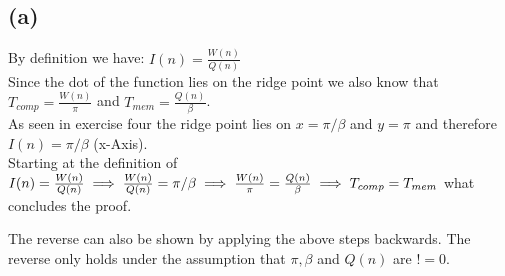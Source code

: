 \documentclass[10pt,a4paper,oneside,notitlepage]{report}
\begin{document}
\subsection*{(a)}
By definition we have: 
$I(n)=\frac{W(n)}{Q(n)}$ \\
Since the dot of the function lies on the ridge point we also know that
$T_{comp} = \frac{W(n)}{\pi}$  and
$T_{mem} = \frac{Q(n)}{\beta}$. \\
As seen in exercise four the ridge point lies on $x=\pi/\beta$ and $y=\pi$ and therefore $I(n)=\pi/\beta$ (x-Axis). \\
Starting at the definition of \\
$I(n)=\frac{W(n)}{Q(n)} \\
 \implies \frac{W(n)}{Q(n)} = \pi/\beta \\
  \implies \frac{W(n)}{\pi} = \frac{Q(n)}{\beta}\\
  \implies T_{comp} = T_{mem}$ what concludes the proof.

The reverse can also be shown by applying the above steps backwards. The reverse only holds under the assumption that $\pi, \beta$ and $Q(n)$ are $!=0$.
\end{document}
